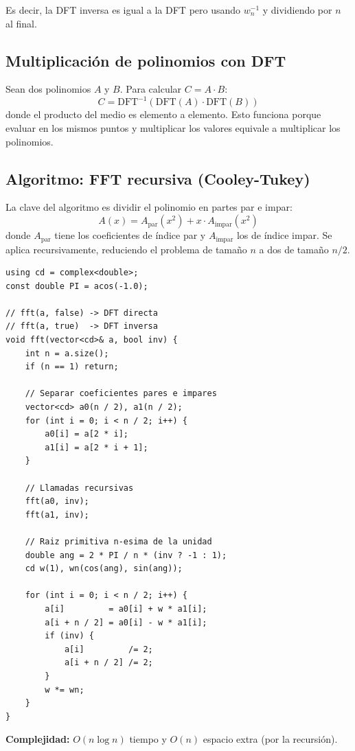 Es decir, la DFT inversa es igual a la DFT pero usando $w_n^{-1}$ y dividiendo por $n$ al final.

\subsection{Multiplicación de polinomios con DFT}

Sean dos polinomios $A$ y $B$. Para calcular $C = A \cdot B$:
\[
C = \text{DFT}^{-1}\!\left(\text{DFT}(A) \cdot \text{DFT}(B)\right)
\]
donde el producto del medio es elemento a elemento. Esto funciona porque evaluar en los mismos puntos y multiplicar los valores equivale a multiplicar los polinomios.

\subsection{Algoritmo: FFT recursiva (Cooley-Tukey)}

La clave del algoritmo es dividir el polinomio en partes par e impar:
\[
A(x) = A_{\text{par}}(x^2) + x \cdot A_{\text{impar}}(x^2)
\]
donde $A_{\text{par}}$ tiene los coeficientes de índice par y $A_{\text{impar}}$ los de índice impar. Se aplica recursivamente, reduciendo el problema de tamaño $n$ a dos de tamaño $n/2$.

\begin{lstlisting}[style=cppstyle, caption={FFT recursiva de Cooley-Tukey}]
using cd = complex<double>;
const double PI = acos(-1.0);

// fft(a, false) -> DFT directa
// fft(a, true)  -> DFT inversa
void fft(vector<cd>& a, bool inv) {
    int n = a.size();
    if (n == 1) return;

    // Separar coeficientes pares e impares
    vector<cd> a0(n / 2), a1(n / 2);
    for (int i = 0; i < n / 2; i++) {
        a0[i] = a[2 * i];
        a1[i] = a[2 * i + 1];
    }

    // Llamadas recursivas
    fft(a0, inv);
    fft(a1, inv);

    // Raiz primitiva n-esima de la unidad
    double ang = 2 * PI / n * (inv ? -1 : 1);
    cd w(1), wn(cos(ang), sin(ang));

    for (int i = 0; i < n / 2; i++) {
        a[i]         = a0[i] + w * a1[i];
        a[i + n / 2] = a0[i] - w * a1[i];
        if (inv) {
            a[i]         /= 2;
            a[i + n / 2] /= 2;
        }
        w *= wn;
    }
}
\end{lstlisting}

\textbf{Complejidad:} $O(n \log n)$ tiempo y $O(n)$ espacio extra (por la recursión).

